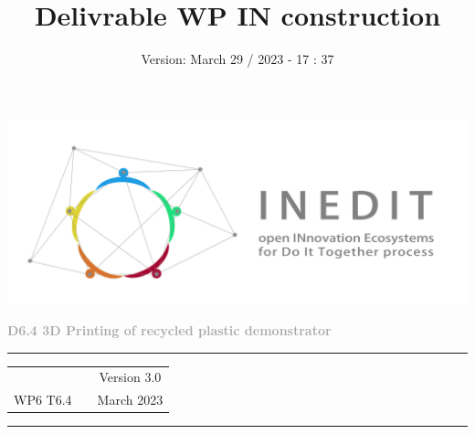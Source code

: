 \documentclass[
  11pt,
]{article}
\title{Delivrable WP IN construction}
\subtitle{Version: March 29 / 2023 - 17 : 37}
\author{}
\date{}
\begin{document}
\maketitle

\begin{titlepage}
	\begin{center}

		\vspace{30mm}
		
		\includegraphics[width=\linewidth]{figures/Inedit_horiz.pdf}\\ 
		
		\vfill
		
		\textbf{\Huge{\textcolor{darkgray}{ D6.4 3D Printing of recycled plastic demonstrator }}} \\ 
		
		\vfill
		
		\vspace{60mm} 
		
		
		
      \textcolor{gray}{\rule{\textwidth}{2pt}}
      
		\vspace{5pt}
		\begin{tabular}{ c p{8cm} c }
           & & Version 3.0  \\ 
         WP6 T6.4  & & March 2023   \\ 
      \end{tabular}
		\vspace{5pt} 
		
		\textcolor{gray}{\rule{\textwidth}{2pt}}
		
		
	
		
		\vfill
		
	\end{center}
\end{titlepage}

\newpage
\end{document}
